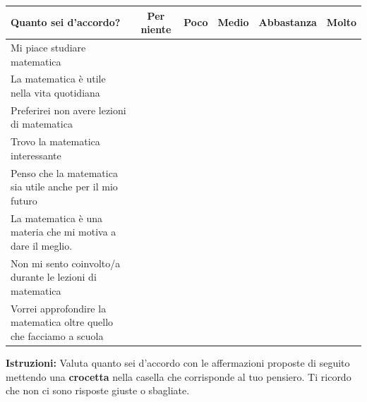 \noindent\begin{tabular}{|p{7cm}|c|c|c|c|c|}
  \hline
  \textbf{Quanto sei d'accordo?} & \textbf{Per niente} & \textbf{Poco} & \textbf{Medio} & \textbf{Abbastanza} & \textbf{Molto} \\
  \hline
  Mi piace studiare matematica & & & & & \\
  \hline
  La matematica è utile nella vita quotidiana & & & & & \\
  \hline
  Preferirei non avere lezioni di matematica & & & & & \\
  \hline
  Trovo la matematica interessante & & & & & \\
  \hline
  Penso che la matematica sia utile anche per il mio futuro & & & & & \\
  \hline
  La matematica è una materia che mi motiva a dare il meglio. & & & & & \\
  \hline 
  Non mi sento coinvolto/a durante le lezioni di matematica & & & & & \\
  \hline
  Vorrei approfondire la matematica oltre quello che facciamo a scuola & & & & & \\
  \hline
\end{tabular}


\newpage

\noindent\textbf{Istruzioni:} Valuta quanto sei d'accordo con le affermazioni proposte di seguito mettendo una \textbf{crocetta} nella casella che corrisponde al tuo pensiero. Ti ricordo che non ci sono risposte giuste o sbagliate. 
\newline

